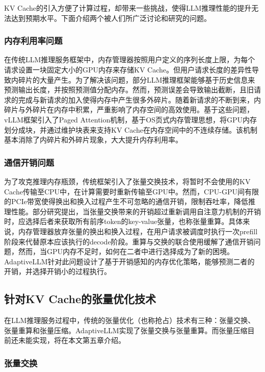KV Cache的引入方便了计算过程，却带来一些挑战，使得LLM推理性能的提升无法达到预期水平。下面介绍两个被人们所广泛讨论和研究的问题。

\subsubsection{内存利用率问题}

在传统LLM推理服务框架\cite{Swapping}中，内存管理器按照用户定义的序列长度上限，为每个请求设置一块固定大小的GPU内存来存储KV Cache。但用户请求长度的差异性导致内碎片的大量产生。为了解决该问题，部分LLM推理框架\cite{Output-Length-Prediction}能够基于历史信息来预测输出长度，并按照预测值分配内存。然而，预测误差会导致输出截断，且旧请求的完成与新请求的加入使得内存中产生很多外碎片。随着新请求的不断到来，内碎片与外碎片在内存中积累，严重影响了内存空间的高效使用。基于这些问题，vLLM框架\cite{vLLM}引入了Paged Attention机制，基于OS页式内存管理思想，将GPU内存划分成块，并通过维护块表来支持KV Cache在内存空间中的不连续存储。该机制基本消除了内碎片和外碎片现象，大大提升内存利用率。

\subsubsection{通信开销问题}

为了攻克推理内存瓶颈，传统框架引入了张量交换技术\cite{Swapping, vLLM, LightLLM}，将暂时不会使用的KV Cache传输至CPU中，在计算需要时重新传输至GPU中。然而，CPU-GPU间有限的PCIe带宽使得换出和换入过程产生不可忽略的通信开销，限制吞吐率，降低推理性能。部分研究提出\cite{Recomputation}，当张量交换带来的开销超过重新调用自注意力机制的开销时，应选择后者来获取所有前序token的key-value张量，也称张量重算。具体来说，内存管理器放弃张量的换出和换入过程，在用户请求被调度时执行一次prefill阶段来代替原本应该执行的decode阶段。重算与交换的联合使用缓解了通信开销问题，然而，当GPU内存不足时，如何在二者中进行选择成为了新的困境。AdaptiveLLM针对此问题设计了基于开销感知的内存优化策略，能够预测二者的开销，并选择开销小的过程执行。

\subsection{针对KV Cache的张量优化技术}

在LLM推理服务过程中，传统的张量优化（也称抢占）技术有三种：张量交换、张量重算和张量压缩\cite{Swapping}。AdaptiveLLM实现了张量交换与张量重算。而张量压缩目前还未能实现，将在本文第五章介绍。

\subsubsection{张量交换}

